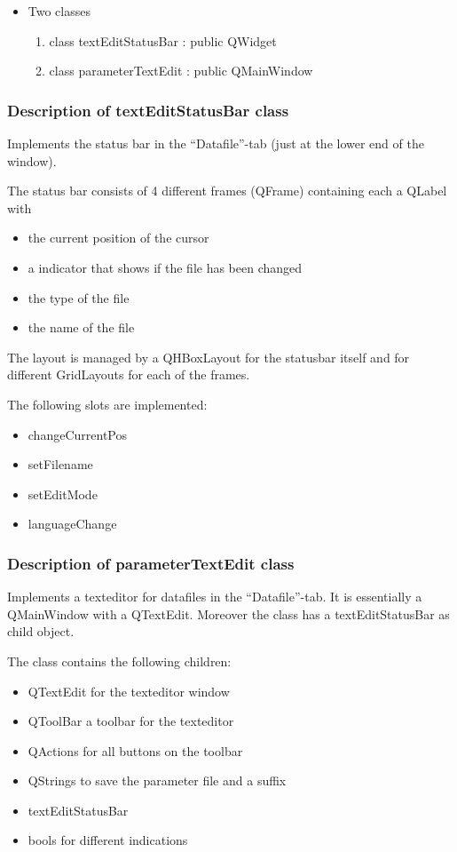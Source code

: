 \documentclass[11pt]{article}
\begin{document}
\begin{itemize}
\item Two classes
\begin{enumerate}
\item class textEditStatusBar : public QWidget
\item class parameterTextEdit : public QMainWindow
\end{enumerate}
\end{itemize}
\subsubsection{Description of textEditStatusBar class}
\label{sec-2-3-1}


Implements the status bar in the ``Datafile''-tab (just at the lower end of the window). 

The status bar consists of 4 different frames (QFrame) containing each a QLabel with
\begin{itemize}
\item the current position of the cursor
\item a indicator that shows if the file has been changed
\item the type of the file
\item the name of the file
\end{itemize}

The layout is managed by a QHBoxLayout for the statusbar itself and for different GridLayouts for each of the frames. 

The following slots are implemented:
\begin{itemize}
\item changeCurrentPos
\item setFilename
\item setEditMode
\item languageChange
\end{itemize}
\subsubsection{Description of parameterTextEdit class}
\label{sec-2-3-2}


Implements a texteditor for datafiles in the ``Datafile''-tab. It is essentially a QMainWindow with a QTextEdit. Moreover the class has a textEditStatusBar as child object.

The class contains the following children:
\begin{itemize}
\item QTextEdit for the texteditor window
\item QToolBar a toolbar for the texteditor
\item QActions for all buttons on the toolbar
\item QStrings to save the parameter file and a suffix
\item textEditStatusBar
\item bools for different indications
\end{itemize}
\end{document}
